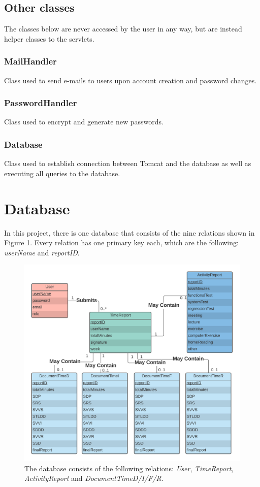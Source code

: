 \documentclass{article}
\begin{document}
\subsection{Other classes}
The classes below are never accessed by the user in any way, but are instead helper classes to the servlets.

\subsubsection{MailHandler}
Class used to send e-mails to users upon account creation and password changes.

\subsubsection{PasswordHandler}
Class used to encrypt and generate new passwords.

\subsubsection{Database}
Class used to establish connection between Tomcat and the database as well as executing all queries to the database.

\section{Database}
In this project, there is one database that consists of the nine relations shown in Figure 1. Every relation has one primary key each, which are the following: \emph{userName} and \emph{reportID}.

\begin{figure}[H]
     \centering
     \includegraphics[width=13cm]{images/PUSPERdiagramVers3_2.png}
     \renewcommand\figurename{Figure}
     \caption{The database consists of the following relations: \emph{User},  \emph{TimeReport}, \emph{ActivityReport} and \emph{DocumentTimeD/I/F/R}.}
     \label{fig:my_label}
 \end{figure}
\end{document}
